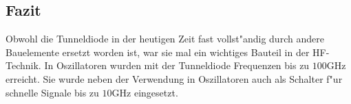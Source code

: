 \begin{refsection}
\section{Fazit}
Obwohl die Tunneldiode in der heutigen Zeit fast vollst"andig durch andere Bauelemente ersetzt worden ist, war sie mal ein wichtiges Bauteil in der HF-Technik.
In Oszillatoren wurden mit der Tunneldiode Frequenzen bis zu $100\text{GHz}$ erreicht.
Sie wurde neben der Verwendung in Oszillatoren auch als Schalter f"ur schnelle Signale bis zu $10\text{GHz}$ eingesetzt.

\printbibliography[heading=subbibliography]
\end{refsection}

